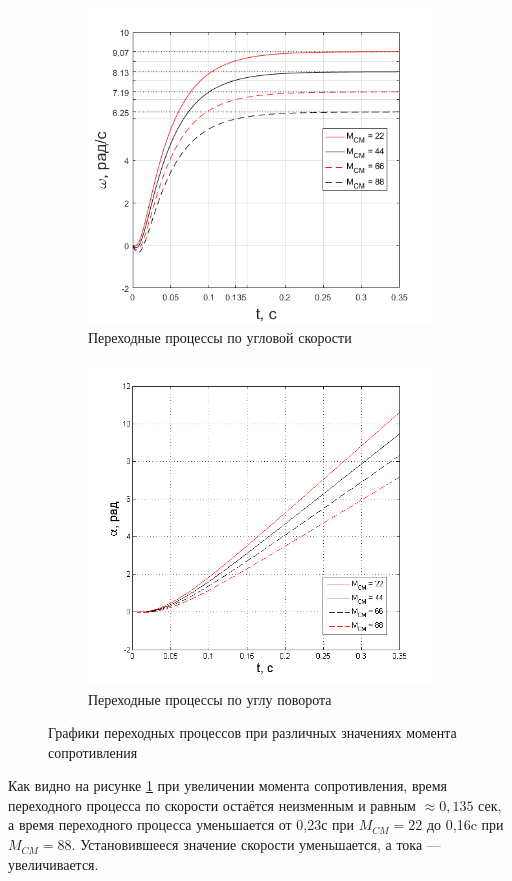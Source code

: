 \documentclass[fleqn, a4paper, 11pt, russian]{article}
\begin{document}
	\begin{figure}[ht!]\ContinuedFloat
		\centering
		\begin{subfigure}[b]{0.49\textwidth}
			\includegraphics[width = \textwidth]{Mvar/MvarOmega}
			\caption{Переходные процессы по угловой скорости}
		\end{subfigure}
		\hfill
		\begin{subfigure}[b]{0.49\textwidth}
			\includegraphics[width = \textwidth]{Mvar/MvarAlpha}
			\caption{Переходные процессы по углу поворота}
		\end{subfigure}
		\caption{Графики переходных процессов при различных значениях момента сопротивления}
		\label{MVar}
	\end{figure}
	Как видно на рисунке \ref{MVar} при увеличении момента сопротивления, время переходного процесса по скорости остаётся неизменным и равным $\approx0,135$ сек, а время переходного процесса уменьшается от 0,23с при $M_{CM} = 22$ до 0,16c при $M_{CM} = 88.$ Установившееся значение скорости уменьшается, а тока --- увеличивается.
	\clearpage
\end{document}
